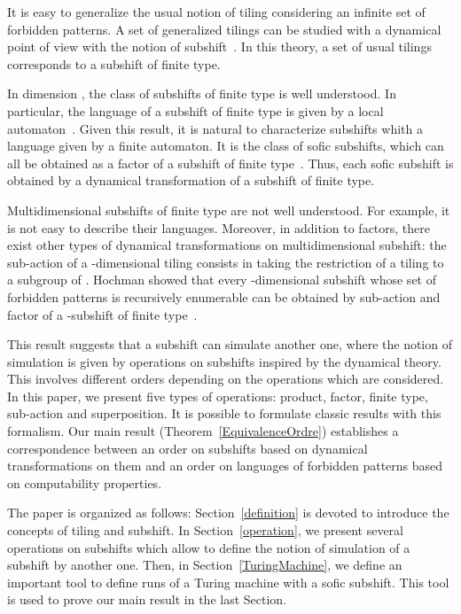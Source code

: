 \documentclass[proceedings]{stacs}
\theoremstyle{plain}\newtheorem{satz}[thm]{Satz}
\theoremstyle{definition}\newtheorem{crucial}[thm]{Crucial Definition}
\begin{document}
It is easy to generalize the usual notion of tiling considering an infinite set of forbidden patterns. A set of generalized tilings can be studied with a dynamical point of view with the notion of subshift~\cite{lind1995isd,kitchens1998sd}. In this theory, a set of usual tilings corresponds to a subshift of finite type. 

In dimension , the class of subshifts of finite type is well understood. In particular, the language of a subshift of finite type is given by a local automaton~\cite{beal1993cs}. Given this result, it is natural to characterize subshifts whith a language given by a finite automaton. It is the class of sofic subshifts, which can all be obtained as a factor of a subshift of finite type~\cite{lind1995isd}. Thus, each sofic subshift is obtained by a dynamical transformation of a subshift of finite type. 

Multidimensional subshifts of finite type are not well understood. For example, it is not easy to describe their languages. Moreover, in addition to factors, there exist other types of dynamical transformations on multidimensional subshift: the sub-action of a -dimensional tiling consists in taking the restriction of a tiling to a subgroup of . Hochman showed that every -dimensional subshift whose set of forbidden patterns is recursively enumerable can be obtained by sub-action and factor of a -subshift of finite type~\cite{hochman2007drp}. 

This result suggests that a subshift can simulate another one, where the notion of simulation is given by operations on subshifts inspired by the dynamical theory. This involves different orders depending on the operations which are considered. In this paper, we present five types of operations: product, factor, finite type, sub-action and superposition. It is possible to formulate classic results with this formalism. Our main result (Theorem~\ref{EquivalenceOrdre}) establishes a correspondence between an order on subshifts based on dynamical transformations on them and an order on languages of forbidden patterns based on computability properties. 

The paper is organized as follows: Section~\ref{definition} is devoted to introduce the concepts of tiling and subshift. In Section~\ref{operation}, we present several operations on subshifts which allow to define the notion of simulation of a subshift by another one. Then, in Section~\ref{TuringMachine}, we define an important tool to define runs of a Turing machine with a sofic subshift. This tool is used to prove our main result in the last Section.
\end{document}
